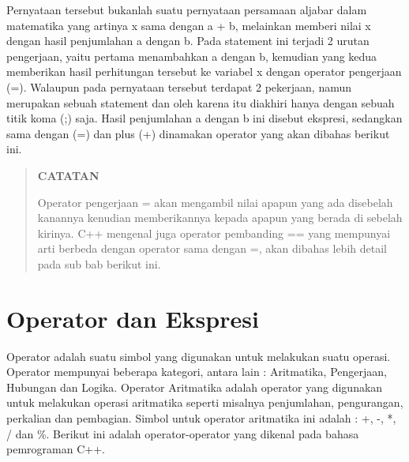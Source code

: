 Pernyataan tersebut bukanlah suatu pernyataan persamaan aljabar dalam
matematika yang artinya x sama dengan a + b, melainkan memberi nilai x
dengan hasil penjumlahan a dengan b. Pada statement ini terjadi 2 urutan
pengerjaan, yaitu pertama menambahkan a dengan b, kemudian yang kedua
memberikan hasil perhitungan tersebut ke variabel x dengan operator
pengerjaan (=). Walaupun pada pernyataan tersebut terdapat 2 pekerjaan,
namun merupakan sebuah statement dan oleh karena itu diakhiri hanya
dengan sebuah titik koma (;) saja. Hasil penjumlahan a dengan b ini
disebut ekspresi, sedangkan sama dengan (=) dan plus (+) dinamakan
operator yang akan dibahas berikut ini.

\begin{quotation}
 {\LARGE {}} \textbf{CATATAN}

 Operator pengerjaan = akan mengambil nilai apapun yang ada disebelah
 kanannya kenudian memberikannya kepada apapun yang berada di sebelah
 kirinya. C++ mengenal juga operator pembanding == yang mempunyai
 arti berbeda dengan operator sama dengan =, akan dibahas lebih
 detail pada sub bab berikut ini.
\end{quotation}


\section{Operator dan Ekspresi}\label{operator-dan-ekspresi}

Operator adalah suatu simbol yang digunakan untuk melakukan suatu
operasi. Operator mempunyai beberapa kategori, antara lain : Aritmatika,
Pengerjaan, Hubungan dan Logika. Operator Aritmatika adalah operator
yang digunakan untuk melakukan operasi aritmatika seperti misalnya
penjumlahan, pengurangan, perkalian dan pembagian. Simbol untuk operator
aritmatika ini adalah : +, -, *, / dan \%. Berikut ini adalah
operator-operator yang dikenal pada bahasa pemrograman C++.

